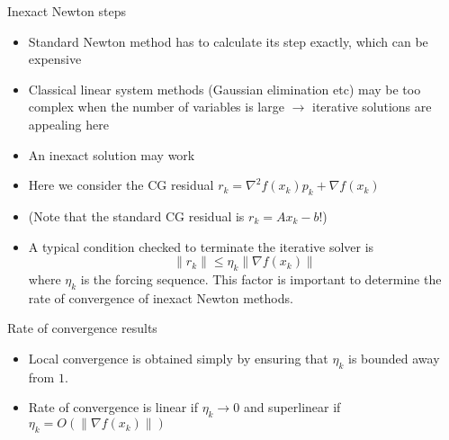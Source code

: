 \documentclass{beamer}
\begin{document}
\begin{frame}[allowframebreaks]{Inexact Newton steps}
	\begin{itemize}
		\item Standard Newton method has to calculate its step exactly, which can be expensive
		\item Classical linear system methods (Gaussian elimination etc) may be too complex when the number of variables is large $\rightarrow$ iterative solutions are appealing here
		\item An inexact solution may work
		\item Here we consider the CG residual $r_k = \nabla^2 f(x_k) p_k + \nabla f(x_k) $
		\item (Note that the standard CG residual is $r_k = Ax_k -b$!)
		\item A typical condition checked to terminate the iterative solver is 
		\[
			\|r_k\| \leq \eta_k \| \nabla f(x_k) \|
		\]
		where $\eta_k$ is the forcing sequence. This factor is important to determine the rate of convergence of inexact Newton methods.
	\end{itemize}
	\vspace{0.5cm}
	Rate of convergence results
	\begin{itemize}
		\item Local convergence is obtained simply by ensuring that $\eta_k$ is bounded away from $1$.
		\item Rate of convergence is linear if $\eta_k \rightarrow 0$ and superlinear if $\eta_k = O(\| \nabla f(x_k) \|)$
	\end{itemize}
\end{frame}
\end{document}

